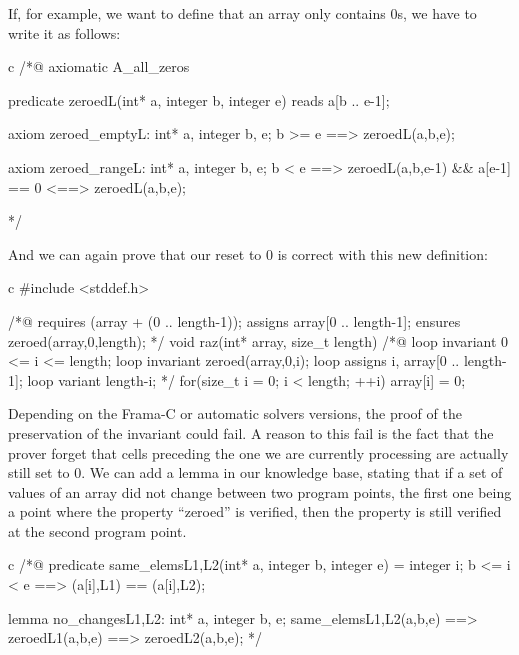 If, for example, we want to define that an array only contains 0s, we
have to write it as follows:



\begin{CodeBlock}{c}
/*@
  axiomatic A_all_zeros{
    predicate zeroed{L}(int* a, integer b, integer e) reads a[b .. e-1];

    axiom zeroed_empty{L}:
      \forall int* a, integer b, e; b >= e ==> zeroed{L}(a,b,e);
      
    axiom zeroed_range{L}:
      \forall int* a, integer b, e; b < e ==>
        zeroed{L}(a,b,e-1) && a[e-1] == 0 <==> zeroed{L}(a,b,e);
  }
*/
\end{CodeBlock}



And we can again prove that our reset to 0 is correct with this new
definition:



\begin{CodeBlock}{c}
#include <stddef.h>

/*@
  requires \valid(array + (0 .. length-1));
  assigns  array[0 .. length-1];
  ensures  zeroed(array,0,length);
*/
void raz(int* array, size_t length){
  /*@
    loop invariant 0 <= i <= length;
    loop invariant zeroed(array,0,i);
    loop assigns i, array[0 .. length-1];
    loop variant length-i;
  */
  for(size_t i = 0; i < length; ++i)
    array[i] = 0;
}
\end{CodeBlock}



Depending on the Frama-C or automatic solvers versions, the proof of the
preservation of the invariant could fail. A reason to this fail is the
fact that the prover forget that cells preceding the one we are
currently processing are actually still set to 0. We can add a lemma in
our knowledge base, stating that if a set of values of an array did not
change between two program points, the first one being a point where the
property ``zeroed'' is verified, then the property is still verified at
the second program point.



\begin{CodeBlock}{c}
/*@
  predicate same_elems{L1,L2}(int* a, integer b, integer e) =
    \forall integer i; b <= i < e ==> \at(a[i],L1) == \at(a[i],L2);

  lemma no_changes{L1,L2}:
  \forall int* a, integer b, e;
  same_elems{L1,L2}(a,b,e) ==> zeroed{L1}(a,b,e) ==> zeroed{L2}(a,b,e);
*/
\end{CodeBlock}



